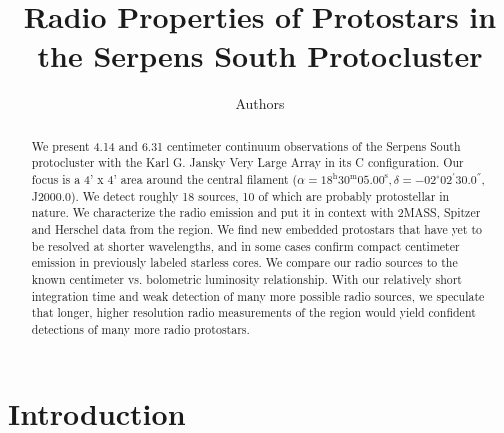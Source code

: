 \documentclass[apj]{emulateapj}
\begin{document}
\title{Radio Properties of Protostars in the Serpens South Protocluster}
\author{Authors}

\begin{abstract}

We present 4.14 and 6.31 centimeter continuum observations of the Serpens South protocluster with the Karl G. Jansky Very Large Array in its C configuration. Our focus is a 4' x 4' area around the central filament ($\alpha=18^{\text{h}}30^{\text{m}}05.00^{\text{s}}, \delta=-02^{\circ}02^{'}30.0^{''}$, J2000.0). We detect roughly 18 sources, 10 of which are probably protostellar in nature. We characterize the radio emission and put it in context with 2MASS, Spitzer and Herschel data from the region. We find new embedded protostars that have yet to be resolved at shorter wavelengths, and in some cases confirm compact centimeter emission in previously labeled starless cores. We compare our radio sources to the known centimeter vs. bolometric luminosity relationship. With our relatively short integration time and weak detection of many more possible radio sources, we speculate that longer, higher resolution radio measurements of the region would yield confident detections of many more radio protostars. 

\end{abstract}

\maketitle
\newpage


\section{Introduction}
\label{sec:introduction}
\end{document}

